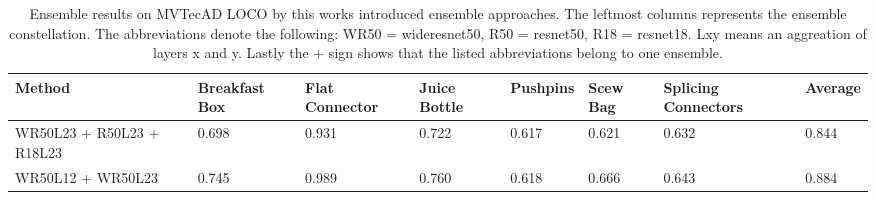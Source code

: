 \begin{table}[htbp]
    \tiny
    \centering
    \begin{tabularx}{\textwidth}{|X|X|X|X|X|X|X|X|}%
        \hline
        \textbf{Method} & \textbf{Breakfast Box} & \textbf{Flat Connector} & \textbf{Juice Bottle} & \textbf{Pushpins} & \textbf{Scew Bag} & \textbf{Splicing Connectors} & \textbf{Average} \\
        \hline
        WR50L23 + R50L23 + R18L23  & 0.698 & 0.931 & 0.722 & 0.617 & 0.621 & 0.632 & 0.844 \\
        \hline
        WR50L12 + WR50L23 & 0.745 & 0.989 & 0.760 & 0.618 & 0.666 & 0.643 & 0.884 \\
        \hline
    \end{tabularx}
    \caption{Ensemble results on MVTecAD LOCO \cite{LOCODentsAndScratchesBergmann2022} by this works introduced ensemble approaches. The leftmost columns represents the ensemble 
             constellation. The abbreviations denote the following: 
             WR50 = wideresnet50, R50 = resnet50, R18 = resnet18. Lxy means an aggreation of layers x and y. Lastly the + sign shows that the listed abbreviations belong to one ensemble.}
    \label{tab:ensembleimageAUROC}
\end{table}




